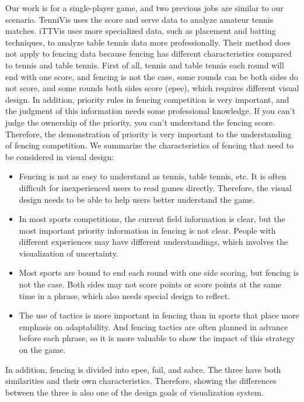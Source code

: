 \documentclass[journal]{vgtc}                %
\begin{document}
Our work is for a single-player game, and two previous jobs are similar to our scenario.
TenniVis\cite{polk2014tennivis} uses the score and serve data to analyze amateur tennis matches.
iTTVis\cite{wu2018ittvis} uses more specialized data, such as placement and batting techniques, to analyze table tennis data more professionally.
Their method does not apply to fencing data because fencing has different characteristics compared to tennis and table tennis.
First of all, tennis and table tennis each round will end with one score, and fencing is not the case, some rounds can be both sides do not score, and some rounds both sides score (epee), which requires different visual design.
In addition, priority rules in fencing competition is very important, and the judgment of this information needs some professional knowledge.
If you can't judge the ownership of the priority, you can't understand the fencing score.
Therefore, the demonstration of priority is very important to the understanding of fencing competition.
We summarize the characteristics of fencing that need to be considered in visual design:
\begin{itemize}
	\item Fencing is not as easy to understand as tennis, table tennis, etc.
	It is often difficult for inexperienced users to read games directly.
	Therefore, the visual design needs to be able to help users better understand the game.
	\item In most sports competitions, the current field information is clear, but the most important priority information in fencing is not clear.
	People with different experiences may have different understandings, which involves the visualization of uncertainty.
	\item Most sports are bound to end each round with one side scoring, but fencing is not the case.
	Both sides may not score points or score points at the same time in a phrase, which also needs special design to reflect.
	\item The use of tactics is more important in fencing than in sports that place more emphasis on adaptability.
	And fencing tactics are often planned in advance before each phrase, so it is more valuable to show the impact of this strategy on the game.
\end{itemize}
In addition, fencing is divided into epee, foil, and sabre.
The three have both similarities and their own characteristics.
Therefore, showing the differences between the three is also one of the design goals of visualization system.
\end{document}
